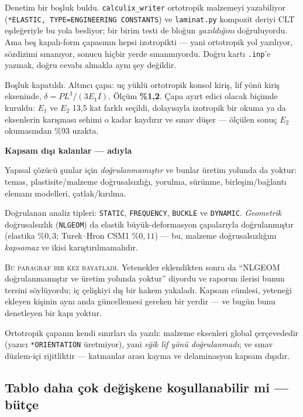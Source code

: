 \documentclass[11pt,a4paper]{article}
\newcommand{\kkkenar}{lacivert}
\newcommand{\kkzemin}{kod}
\newenvironment{renkkutu}[3]{%
  \renewcommand{\kkkenar}{#1}\renewcommand{\kkzemin}{#2}%
  \par\medskip\noindent
  \begin{lrbox}{\kutugovde}%
  \begin{minipage}{\dimexpr\linewidth-2\fboxsep-2\fboxrule\relax}\footnotesize
  \textcolor{#1}{\textbf{#3}}\par\vspace{3pt}%
}{%
  \end{minipage}%
  \end{lrbox}%
  \noindent\fcolorbox{\kkkenar}{\kkzemin}{\usebox{\kutugovde}}%
  \par\medskip
}
\newenvironment{dikkat}[1]{\begin{renkkutu}{orta}{ortabg}{#1}}{\end{renkkutu}}
\begin{document}
Denetim bir boşluk buldu. \texttt{calculix\_writer} ortotropik malzemeyi
yazabiliyor (\texttt{*ELASTIC, TYPE=ENGINEERING CONSTANTS}) ve
\texttt{laminat.py} kompozit deriyi CLT eşdeğeriyle bu yola besliyor; bir
birim testi de bloğun \emph{yazıldığını} doğruluyordu. Ama beş kapalı-form
çapasının hepsi izotropikti --- yani ortotropik yol yazılıyor, sözdizimi
sınanıyor, sonucu hiçbir yerde sınanmıyordu. Doğru kartı \texttt{.inp}'e
yazmak, doğru cevabı almakla aynı şey değildir.

Boşluk kapatıldı. Altıncı çapa: uç yüklü ortotropik konsol kiriş, lif yönü
kiriş ekseninde, $\delta = PL^3/(3E_1I)$. Ölçüm \textbf{\%1{,}2}. Çapa
ayırt edici olacak biçimde kuruldu: $E_1$ ve $E_2$ 13{,}5 kat farklı seçildi,
dolayısıyla izotropik bir okuma ya da eksenlerin karışması sehimi o kadar
kaydırır ve sınav düşer --- ölçülen sonuç $E_2$ okumasından \%93 uzakta.

\begin{dikkat}{Kapsam dışı kalanlar --- adıyla}
Yapısal çözücü şunlar için \emph{doğrulanmamıştır} ve bunlar üretim yolunda
da yoktur: temas, plastisite/malzeme doğrusalsızlığı, yorulma, sürünme,
birleşim/bağlantı elemanı modelleri, çatlak/kırılma.

Doğrulanan analiz tipleri: \texttt{STATIC}, \texttt{FREQUENCY},
\texttt{BUCKLE} ve \texttt{DYNAMIC}. \emph{Geometrik} doğrusalsızlık
(\texttt{NLGEOM}) da elastik büyük-deformasyon çapalarıyla doğrulanmıştır
(elastika \%$0{,}3$; Turek--Hron CSM1 \%$0{,}11$) --- bu, malzeme
doğrusalsızlığını \emph{kapsamaz} ve ikisi karıştırılmamalıdır.

\textsc{Bu paragraf bir kez bayatladı.} Yetenekler eklendikten sonra da
``NLGEOM doğrulanmamıştır ve üretim yolunda yoktur'' diyordu ve raporun
ilerisi bunun tersini söylüyordu; iç çelişkiyi dış bir hakem yakaladı.
Kapsam cümlesi, yeteneği ekleyen kişinin aynı anda güncellemesi gereken
bir yerdir --- ve bugün bunu denetleyen bir kapı yoktur.

Ortotropik çapanın kendi sınırları da yazılı: malzeme eksenleri global
çerçevededir (yazıcı \texttt{*ORIENTATION} üretmiyor), yani \emph{eğik lif
yönü doğrulanmadı}; ve sınav düzlem-içi rijitliktir --- katmanlar arası
kayma ve delaminasyon kapsam dışıdır.
\end{dikkat}

\subsection{Tablo daha çok değişkene koşullanabilir mi --- bütçe}
\label{sub:kosullama}
\end{document}
